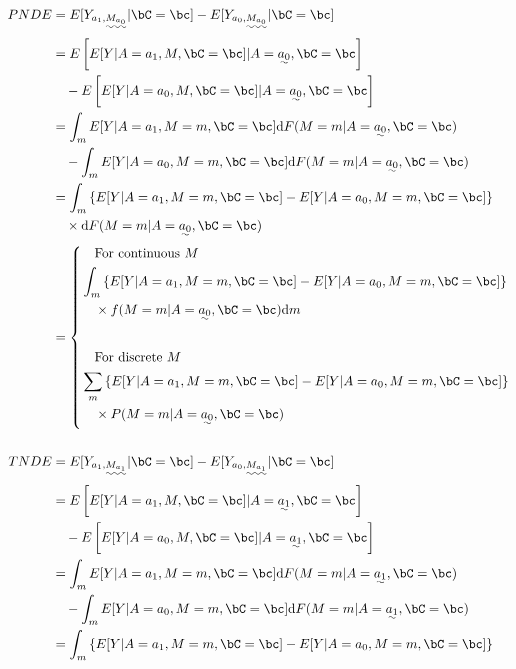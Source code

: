 \documentclass[10pt]{article}
\begin{document}
\begin{align*}
  PNDE
  &= E[Y_{a_{1},\uwave{M_{a_{0}}}} | \bC = \bc] - E[Y_{a_{0},\uwave{M_{a_{0}}}} | \bC = \bc]\\
  &=     E \left[ E[Y | A = a_{1}, M, \bC = \bc] | A = \uwave{a_{0}}, \bC = \bc \right]\\
  &~~~ - E \left[ E[Y | A = a_{0}, M, \bC = \bc] | A = \uwave{a_{0}}, \bC = \bc \right]\\
  &=     \int_{m} E[Y | A = a_{1}, M = m, \bC = \bc] \mathrm{d}F(M = m | A = \uwave{a_{0}}, \bC = \bc)\\
  &~~~ - \int_{m} E[Y | A = a_{0}, M = m, \bC = \bc] \mathrm{d}F(M = m | A = \uwave{a_{0}}, \bC = \bc)\\
  &= \int_{m} \left\{ E[Y | A = a_{1}, M = m, \bC = \bc] - E[Y | A = a_{0}, M = m, \bC = \bc] \right\}\\
  &~~~ \times \mathrm{d}F(M = m | A = \uwave{a_{0}}, \bC = \bc)\\
  &= \left\{
  \begin{aligned}
  &~~~\text{For continuous }M\\
  &\int_{m} \left\{ E[Y | A = a_{1}, M = m, \bC = \bc] - E[Y | A = a_{0}, M = m, \bC = \bc] \right\}\\
  &~~~ \times f(M = m | A = \uwave{a_{0}}, \bC = \bc) \mathrm{d}m\\
  &\\
  &~~~\text{For discrete }M\\
  &\sum_{m} \left\{ E[Y | A = a_{1}, M = m, \bC = \bc] - E[Y | A = a_{0}, M = m, \bC = \bc] \right\}\\
  &~~~ \times P(M = m | A = \uwave{a_{0}}, \bC = \bc)\\
  \end{aligned}
\right .\\
  \\
  TNDE
  &= E[Y_{a_{1},\uwave{M_{a_{1}}}} | \bC = \bc] - E[Y_{a_{0},\uwave{M_{a_{1}}}} | \bC = \bc]\\
  &=     E \left[ E[Y | A = a_{1}, M, \bC = \bc] | A = \uwave{a_{1}}, \bC = \bc \right]\\
  &~~~ - E \left[ E[Y | A = a_{0}, M, \bC = \bc] | A = \uwave{a_{1}}, \bC = \bc \right]\\
  &=     \int_{m} E[Y | A = a_{1}, M = m, \bC = \bc] \mathrm{d}F(M = m | A = \uwave{a_{1}}, \bC = \bc)\\
  &~~~ - \int_{m} E[Y | A = a_{0}, M = m, \bC = \bc] \mathrm{d}F(M = m | A = \uwave{a_{1}}, \bC = \bc)\\
  &= \int_{m} \left\{ E[Y | A = a_{1}, M = m, \bC = \bc] - E[Y | A = a_{0}, M = m, \bC = \bc] \right\}\\

\end{align*}
\end{document}
